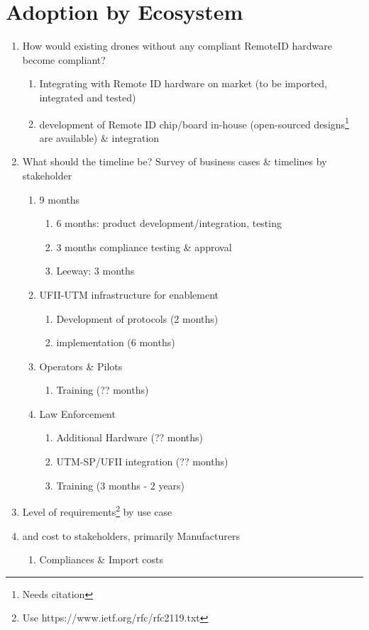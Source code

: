 \documentclass{ua_wgs_base}
\begin{document}
\section{Adoption by Ecosystem}
\begin{enumerate}
\item How would existing drones without any compliant RemoteID hardware
become compliant?
\begin{enumerate}
\item Integrating with Remote ID hardware on market (to be imported, integrated
and tested)
\item development of Remote ID chip/board in-house (open-sourced designs\footnote{Needs citation}
are available) \& integration
\end{enumerate}
\item What should the timeline be? Survey of business cases \& timelines
by stakeholder
\begin{enumerate}
\item 9 months
\begin{enumerate}
\item 6 months: product development/integration, testing
\item 3 months compliance testing \& approval
\item Leeway: 3 months
\end{enumerate}
\item UFII-UTM infrastructure for enablement
\begin{enumerate}
\item Development of protocols (2 months)
\item implementation (6 months)
\end{enumerate}
\item Operators \& Pilots
\begin{enumerate}
\item Training (?? months)
\end{enumerate}
\item Law Enforcement
\begin{enumerate}
\item Additional Hardware (?? months)
\item UTM-SP/UFII integration (?? months)
\item Training (3 months - 2 years)
\end{enumerate}
\end{enumerate}
\item Level of requirements\footnote{Use https://www.ietf.org/rfc/rfc2119.txt}
by use case
\item and cost to stakeholders, primarily Manufacturers
\begin{enumerate}
\item Compliances \& Import costs
\end{enumerate}
\end{enumerate}
\end{document}
